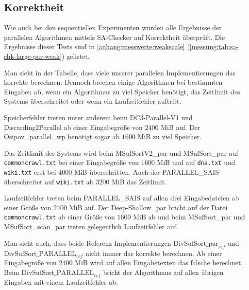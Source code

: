 \subsection{\sa Korrektheit}

Wie  auch bei den sequentiellen Experimenten wurden alle Ergebnisse der parallelen Algorithmen mittels SA-Checker auf Korrektheit überprüft.
Die Ergebnisse dieser Tests sind in \cref{anhang:messwerte:weakscale} (\cref{messung:tab:sa-chk-large-par-weak}) gelistet.

Man sieht in der Tabelle, dass viele unserer parallelen Implementierungen das korrekte \sa berechnen. Dennoch brechen einige Algorithmen bei bestimmten Eingaben ab, wenn ein Algorithmus zu viel Speicher benötigt, das Zeitlimit des Systems überschreitet oder wenn ein Laufzeitfehler auftritt. \par
Speicherfehler treten unter anderem beim DC3-Parallel-V1 und Discarding2\-Parallel ab einer Eingabegröße von $2400$ MiB auf. Der Osipov\_parallel\_wp benötigt sogar ab $1600$ MiB zu viel Speicher. \par
Das Zeitlimit des Systems wird beim MSufSortV2\_par und MSufSort\_par auf \texttt{commoncrawl.txt} bei einer Eingabegröße von $1600$ MiB und auf \texttt{dna.txt} und \texttt{wiki.txt} erst bei $4000$ MiB überschritten. Auch der PARALLEL\_SAIS überschreitet auf \texttt{wiki.txt} ab $3200$ MiB das Zeitlimit. \par
Laufzeitfehler treten beim PARALLEL\_SAIS auf allen drei Eingabedateien ab einer Größe von $2400$ MiB auf. Der Deep-Shallow\_par bricht auf der Datei \texttt{commoncrawl.txt} ab einer Größe von $1600$ MiB ab und beim MSufSort\_par und MSufSort\_scan\_par treten gelegentlich Laufzeitfehler auf. \par
Man sieht auch, dass beide Referenz-Implementierungen $\text{DivSufSort\_par}_{ref}$ und $\text{DivSufSort\_PARALLEL}_{ref}$ nicht immer das korrekte \sa berechnen. Ab einer Eingabegröße von $2400$ MiB wird auf allen Eingabetexten das falsche \sa berechnet. Beim $\text{DivSufSort\_PARALLEL}_{ref}$ bricht der Algorithmus auf allen übrigen Eingaben mit einem Laufzeitfehler ab.
